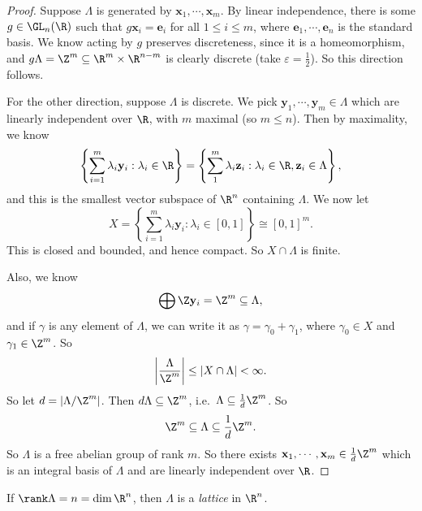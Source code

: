 \documentclass[a4paper]{article}
\begin{document}
\begin{proof}
  Suppose $\Lambda$ is generated by $\mathbf{x}_1, \cdots, \mathbf{x}_m$. By linear independence, there is some $g \in \GL_n(\R)$ such that $g \mathbf{x}_i = \mathbf{e}_i$ for all $1 \leq i \leq m$, where $\mathbf{e}_1, \cdots, \mathbf{e}_n$ is the standard basis. We know acting by $g$ preserves discreteness, since it is a homeomorphism, and $g\Lambda = \Z^m \subseteq \R^m \times \R^{n - m}$ is clearly discrete (take $\varepsilon = \frac{1}{2}$). So this direction follows.

  For the other direction, suppose $\Lambda$ is discrete. We pick $\mathbf{y}_1, \cdots, \mathbf{y}_m \in \Lambda$ which are linearly independent over $\R$, with $m$ maximal (so $m \leq n$). Then by maximality, we know
  \[
    \left\{\sum_{i = 1}^m \lambda_i \mathbf{y}_i: \lambda_i \in \R\right\} = \left\{ \sum_1^m \lambda_i \mathbf{z}_i: \lambda_i \in \R, \mathbf{z}_i \in \Lambda\right\},
  \]
  and this is the smallest vector subspace of $\R^n$ containing $\Lambda$. We now let
  \[
    X = \left\{\sum_{i = 1}^m \lambda_i \mathbf{y}_i: \lambda_i \in [0, 1]\right\} \cong [0, 1]^m.
  \]
  This is closed and bounded, and hence compact. So $X \cap \Lambda$ is finite.

  Also, we know
  \[
    \bigoplus \Z \mathbf{y}_i = \Z^m \subseteq \Lambda,
  \]
  and if $\gamma$ is any element of $\Lambda$, we can write it as $\gamma = \gamma_0 + \gamma_1$, where $\gamma_0 \in X$ and $\gamma_1 \in \Z^m$. So
  \[
    \left|\frac{\Lambda}{\Z^m}\right| \leq |X \cap \Lambda| < \infty.
  \]
  So let $d = |\Lambda/\Z^m|$. Then $d \Lambda \subseteq \Z^m$, i.e.\ $\Lambda \subseteq \frac{1}{d} \Z^m$. So
  \[
    \Z^m \subseteq \Lambda \subseteq \frac{1}{d} \Z^m.
  \]
  So $\Lambda$ is a free abelian group of rank $m$. So there exists $\mathbf{x}_1, \cdots, \mathbf{x}_m \in \frac{1}{d}\Z^m$ which is an integral basis of $\Lambda$ and are linearly independent over $\R$.
\end{proof}

\begin{defi}[Lattice]
  If $\rank \Lambda = n = \dim \R^n$, then $\Lambda$ is a \emph{lattice} in $\R^n$.
\end{defi}
\end{document}
